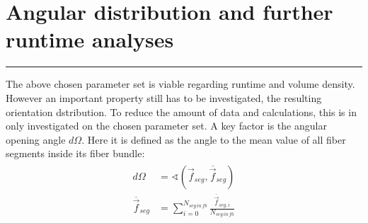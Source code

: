 \section{Angular distribution and further runtime analyses}
% 
\par
\noindent\rule{\textwidth}{2pt}
\par 
% 
The above chosen parameter set is viable regarding runtime and volume density.
However an important property still has to be investigated, the resulting orientation dstribution.
To reduce the amount of data and calculations, this is in only investigated on the chosen parameter set.
A key factor is the angular opening angle $d\Omega$. Here it is defined as the angle to the mean value of all fiber segments inside its fiber bundle:
\begin{align}
    \begin{split}
        d\Omega &= \sphericalangle(\vec{f}_{\mathit{seg}}, \overbar{\vec{f}}_{\mathit{seg}})\\
        \overbar{\vec{f}}_{\mathit{seg}} &= \sum^{N_{\mathit{seg\, in\, fb}}}_{i=0} \frac{\overbar{\vec{f}}_{\mathit{seg},i}}{N_{\mathit{seg\, in\, fb}}}
    \end{split}
\end{align}
% 

